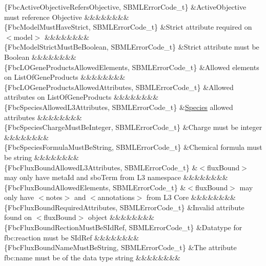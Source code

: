 \begin{DoxyParagraph}{}
\begin{longtabu}
\{Fbc\+Active\+Objective\+Refers\+Objective, S\+B\+M\+L\+Error\+Code\+\_\+t\} &Active\+Objective must reference Objective &&&&&&&&\\
\{Fbc\+Model\+Must\+Have\+Strict, S\+B\+M\+L\+Error\+Code\+\_\+t\} &\textquotesingle{}Strict\textquotesingle{} attribute required on {\ttfamily $<$model$>$} &&&&&&&&\\
\{Fbc\+Model\+Strict\+Must\+Be\+Boolean, S\+B\+M\+L\+Error\+Code\+\_\+t\} &\textquotesingle{}Strict\textquotesingle{} attribute must be Boolean &&&&&&&&\\
\{Fbc\+L\+O\+Gene\+Products\+Allowed\+Elements, S\+B\+M\+L\+Error\+Code\+\_\+t\} &Allowed elements on List\+Of\+Gene\+Products &&&&&&&&\\
\{Fbc\+L\+O\+Gene\+Products\+Allowed\+Attributes, S\+B\+M\+L\+Error\+Code\+\_\+t\} &Allowed attributes on List\+Of\+Gene\+Products &&&&&&&&\\
\{Fbc\+Species\+Allowed\+L3\+Attributes, S\+B\+M\+L\+Error\+Code\+\_\+t\} &\hyperlink{class_species}{Species} allowed attributes &&&&&&&&\\
\{Fbc\+Species\+Charge\+Must\+Be\+Integer, S\+B\+M\+L\+Error\+Code\+\_\+t\} &Charge must be integer &&&&&&&&\\
\{Fbc\+Species\+Formula\+Must\+Be\+String, S\+B\+M\+L\+Error\+Code\+\_\+t\} &Chemical formula must be string &&&&&&&&\\
\{Fbc\+Flux\+Bound\+Allowed\+L3\+Attributes, S\+B\+M\+L\+Error\+Code\+\_\+t\} &{\ttfamily $<$flux\+Bound$>$} may only have \textquotesingle{}meta\+Id\textquotesingle{} and \textquotesingle{}sbo\+Term\textquotesingle{} from L3 namespace &&&&&&&&\\
\{Fbc\+Flux\+Bound\+Allowed\+Elements, S\+B\+M\+L\+Error\+Code\+\_\+t\} &{\ttfamily $<$flux\+Bound$>$} may only have {\ttfamily $<$notes$>$} and {\ttfamily $<$annotations$>$} from L3 Core &&&&&&&&\\
\{Fbc\+Flux\+Bound\+Required\+Attributes, S\+B\+M\+L\+Error\+Code\+\_\+t\} &Invalid attribute found on {\ttfamily $<$flux\+Bound$>$} object &&&&&&&&\\
\{Fbc\+Flux\+Bound\+Rection\+Must\+Be\+S\+Id\+Ref, S\+B\+M\+L\+Error\+Code\+\_\+t\} &Datatype for \textquotesingle{}fbc\+:reaction\textquotesingle{} must be S\+Id\+Ref &&&&&&&&\\
\{Fbc\+Flux\+Bound\+Name\+Must\+Be\+String, S\+B\+M\+L\+Error\+Code\+\_\+t\} &The attribute \textquotesingle{}fbc\+:name\textquotesingle{} must be of the data type string &&&&&&&&\\

\end{longtabu}
\end{DoxyParagraph}
